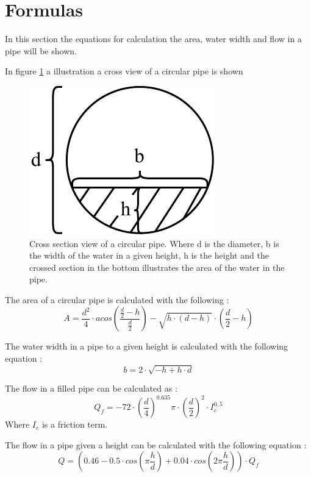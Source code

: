 \newpage
\section{Formulas}\label{app:formulas}
In this section the equations for calculation the area, water width and flow in a pipe will be shown.
%


In figure \ref{fig:calc_water_pipe_width} a illustration a cross view of a circular pipe is shown
\begin{figure}[H]
	\centering
	\includegraphics[width=0.20\textheight]{report/appendix/figures/calc_water_pipe_width.pdf}
	\caption{Cross section view of a circular pipe. Where d is the diameter, b is the width of the water in a given height, h is the height and the crossed section in the bottom illustrates the area of the water in the pipe.}
	\label{fig:calc_water_pipe_width}
\end{figure}

The area of a circular pipe is calculated with the following \cite{ikke_stationear}: 
\begin{equation}\label{eq:calc_area_open_channel}
	A = \frac {d^2}{4} \cdot acos \left(\frac{\frac{d}{2}-h}{\frac{d}{2}}\right)-\sqrt{h\cdot (d-h)}\cdot  \left(\frac{d}{2}-h\right)
\end{equation}

The water width in a pipe to a given height is calculated with the following equation \cite{ikke_stationear}:
\begin{equation}
	b = 2 \cdot \sqrt{-h+h\cdot d}
\end{equation}

The flow in a filled pipe can be calculated as \cite{ikke_stationear}:
\begin{equation}\label{eq:qf_for_flow}
	Q_f =-72\cdot \left(\frac{d}{4}\right)^{0.635}\pi\cdot\left(\frac{d}{2}\right)^2\cdot I_e^{0,5}%
\end{equation}
Where $I_e$ is a friction term. 

The flow in a pipe given a height can be calculated with the following equation \cite{ikke_stationear}:
\begin{equation}\label{eq:calc_for_flowv2}
 	Q = \left(0.46-0.5 \cdot cos\left(\pi \frac{h}{d}\right)+0.04\cdot cos\left(2\pi\frac{h}{d}\right)\right)\cdot Q_f
\end{equation}

